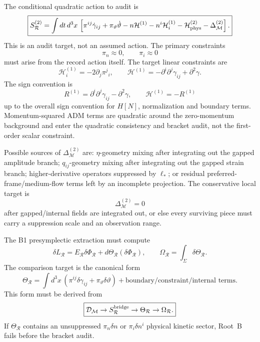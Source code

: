 \documentclass[11pt]{article}
\begin{document}
The conditional quadratic action to audit is
\[
\boxed{
S_{\mathcal R}^{(2)}
=\int dt\,d^3x\,
\left[
\pi^{ij}\dot\gamma_{ij}
+\pi_\vartheta\dot\vartheta
-n\mathcal H^{(1)}
-n^i\mathcal H_i^{(1)}
-\mathcal H_{\rm phys}^{(2)}
-\Delta_{\mathcal M}^{(2)}
\right].
}
\]
This is an audit target, not an assumed action.  The primary constraints
\[
\boxed{\pi_n\approx0,\qquad \pi_i\approx0}
\]
must arise from the record action itself.  The target linear constraints are
\[
\boxed{
\mathcal H_i^{(1)}=-2\partial_j\pi^j{}_i,\qquad
\mathcal H^{(1)}=-\partial^i\partial^j\gamma_{ij}+\partial^2\gamma.
}
\]
The sign convention is
\[
\boxed{
R^{(1)}=\partial^i\partial^j\gamma_{ij}-\partial^2\gamma,\qquad
\mathcal H^{(1)}=-R^{(1)}
}
\]
up to the overall sign convention for \(H[N]\), normalization and boundary
terms.  Momentum-squared ADM terms are quadratic around the zero-momentum
background and enter the quadratic consistency and bracket audit, not the
first-order scalar constraint.

Possible sources of \(\Delta_{\mathcal M}^{(2)}\) are: \(\eta\)-geometry
mixing after integrating out the gapped amplitude branch; \(q_{ij}\)-geometry
mixing after integrating out the gapped strain branch; higher-derivative
operators suppressed by \(\ell_*\); or residual preferred-frame/medium-flow
terms left by an incomplete projection.  The conservative local target is
\[
\boxed{\Delta_{\mathcal M}^{(2)}=0}
\]
after gapped/internal fields are integrated out, or else every surviving piece
must carry a suppression scale and an observation range.

The B1 presymplectic extraction must compute
\[
\boxed{
\delta L_{\mathcal R}=E_{\mathcal R}\delta\Phi_{\mathcal R}
+d\Theta_{\mathcal R}(\delta\Phi_{\mathcal R}),\qquad
\Omega_{\mathcal R}=\int_\Sigma\delta\Theta_{\mathcal R}.
}
\]
The comparison target is the canonical form
\[
\boxed{
\Theta_{\mathcal R}
=\int d^3x\,\left(\pi^{ij}\delta\gamma_{ij}
+\pi_\vartheta\delta\vartheta\right)
+\text{boundary/constraint/internal terms}.
}
\]
This form must be derived from
\[
\boxed{\mathcal D_{\mathcal M}\to S_{\mathcal R}^{\rm bridge}
\to\Theta_{\mathcal R}\to\Omega_{\mathcal R}.}
\]
If \(\Theta_{\mathcal R}\) contains an unsuppressed
\(\pi_n\delta n\) or \(\pi_i\delta n^i\) physical kinetic sector, Root~B fails
before the bracket audit.
\end{document}
